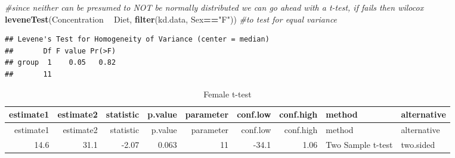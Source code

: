 \documentclass[]{article}
\newenvironment{Shaded}{\begin{snugshade}}{\end{snugshade}}
\newcommand{\CommentTok}[1]{\textcolor[rgb]{0.56,0.35,0.01}{\textit{#1}}}
\newcommand{\DataTypeTok}[1]{\textcolor[rgb]{0.13,0.29,0.53}{#1}}
\newcommand{\KeywordTok}[1]{\textcolor[rgb]{0.13,0.29,0.53}{\textbf{#1}}}
\newcommand{\NormalTok}[1]{#1}
\newcommand{\OperatorTok}[1]{\textcolor[rgb]{0.81,0.36,0.00}{\textbf{#1}}}
\newcommand{\StringTok}[1]{\textcolor[rgb]{0.31,0.60,0.02}{#1}}
\begin{document}
\begin{Shaded}
\begin{Highlighting}[]
\CommentTok{#since neither can be presumed to NOT be normally distributed we can go ahead with a t-test, if fails then wilocox}
\KeywordTok{leveneTest}\NormalTok{(Concentration }\OperatorTok{~}\StringTok{ }\NormalTok{Diet, }\KeywordTok{filter}\NormalTok{(kd.data, Sex}\OperatorTok{==}\StringTok{"F"}\NormalTok{)) }\CommentTok{#to test for equal variance}
\end{Highlighting}
\end{Shaded}

\begin{verbatim}
## Levene's Test for Homogeneity of Variance (center = median)
##       Df F value Pr(>F)
## group  1    0.05   0.82
##       11
\end{verbatim}

\begin{Shaded}
\end{Shaded}

\begin{longtable}[]{@{}rrrrrrrll@{}}
\caption{Female t-test}\tabularnewline
\toprule
estimate1 & estimate2 & statistic & p.value & parameter & conf.low &
conf.high & method & alternative\tabularnewline
\midrule
\endfirsthead
\toprule
estimate1 & estimate2 & statistic & p.value & parameter & conf.low &
conf.high & method & alternative\tabularnewline
\midrule
\endhead
14.6 & 31.1 & -2.07 & 0.063 & 11 & -34.1 & 1.06 & Two Sample t-test &
two.sided\tabularnewline
\bottomrule
\end{longtable}

\begin{Shaded}
\end{Shaded}
\end{document}

